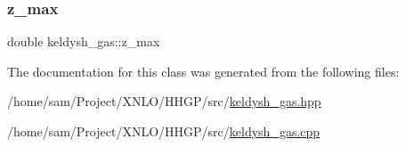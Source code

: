 \mbox{\label{classkeldysh__gas_a117691dd8b6fd06b34a73392c0e73e32}} 
\subsubsection{\texorpdfstring{z\+\_\+max}{z\_max}}
{\footnotesize\ttfamily double keldysh\+\_\+gas\+::z\+\_\+max}



The documentation for this class was generated from the following files\+:\begin{DoxyCompactItemize}
\item 
/home/sam/\+Project/\+X\+N\+L\+O/\+H\+H\+G\+P/src/\hyperlink{keldysh__gas_8hpp}{keldysh\+\_\+gas.\+hpp}\item 
/home/sam/\+Project/\+X\+N\+L\+O/\+H\+H\+G\+P/src/\hyperlink{keldysh__gas_8cpp}{keldysh\+\_\+gas.\+cpp}\end{DoxyCompactItemize}
